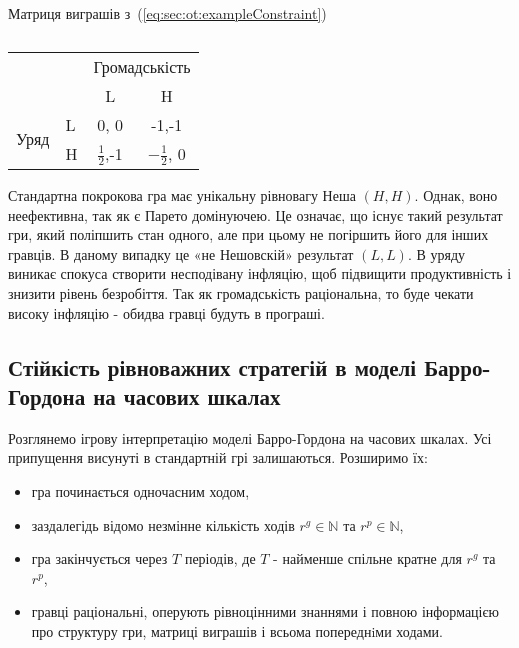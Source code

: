 \begin{table}[h]
	\centering
	
	\caption{}	
 Матриця виграшів з~(\ref{eq:sec:ot:exampleConstraint})\\
	\normalsize
\begin{tabular}{|l|l|c|c|}
	\hline
	\multicolumn{2}{|l|}{\multirow{2}{*}{}} & \multicolumn{2}{l|}{Громадськість} \\ \cline{3-4} 
	\multicolumn{2}{|l|}{}                  & L                & H                \\ \hline
	\multirow{2}{*}{Уряд}    & L   & 0, 0             & -1,-1            \\ \cline{2-4} 
	& H   & $\frac{1}{2}$,-1             & $-\frac{1}{2}$, 0            \\ \hline
\end{tabular}
		
	\label{table:sec:ot:real}
\end{table}


Стандартна покрокова гра має унікальну рівновагу Неша $(H,H)$. Однак, воно неефективна, так як є Парето домінуючею. Це означає, що існує такий результат гри, який поліпшить стан одного, але при цьому не погіршить його для інших гравців. В даному випадку це «не Нешовскій» результат $(L,L)$.  В уряду виникає спокуса створити несподівану інфляцію, щоб підвищити продуктивність і знизити рівень безробіття. Так як громадськість раціональна, то буде чекати високу інфляцію - обидва гравці будуть в програші.

\subsection{Стійкість рівноважних стратегій в моделі Барро-Гордона на
	часових шкалах} 

Розглянемо ігрову інтерпретацію моделі Барро-Гордона на часових шкалах.
Усі припущення висунуті в стандартній грі залишаються. Розширимо їх:
\begin{itemize}
	\item гра починається одночасним ходом, 
	\item заздалегідь відомо незмінне кількість ходів $r^g \in \mathbb{N}$ та $r^p \in \mathbb{N}$,
	\item гра закінчується через $T$ періодів, де $T$ - найменше спільне кратне для $r^g$ та $r^p$,
	\item гравці раціональні, оперують рівноцінними знаннями і повною інформацією про структуру гри, матриці виграшів і всьома попереднiми ходами.
\end{itemize}

